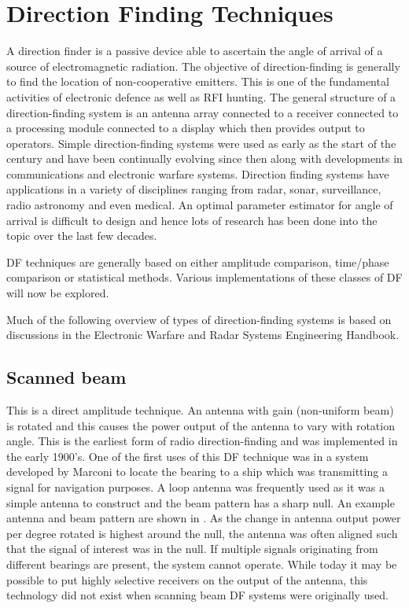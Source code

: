 \section{Direction Finding Techniques}
A direction finder is a passive device able to ascertain the angle of arrival of a source of electromagnetic radiation.
The objective of direction-finding is generally to find the location of non-cooperative emitters\cite{poisel2012electronic}.
This is one of the fundamental activities of electronic defence as well as RFI hunting.
The general structure of a direction-finding system is an antenna array connected to a receiver connected to a processing module connected to a display which then provides output to operators.
Simple direction-finding systems were used as early as the start of the  century and have been continually evolving since then along with developments in communications and electronic warfare systems.
Direction finding systems have applications in a variety of disciplines ranging from radar, sonar, surveillance, radio astronomy and even medical. An optimal parameter estimator for angle of arrival is difficult to design and hence lots of research has been done into the topic over the last few decades\cite{van2004detection}.

DF techniques are generally based on either amplitude comparison, time/phase comparison or statistical methods\cite{tuncer2009classical}. 
Various implementations of these classes of DF will now be explored.

Much of the following overview of types of direction-finding systems is based on discussions in the Electronic Warfare and Radar Systems Engineering Handbook\cite{center2012electronic}.

\subsection{Scanned beam}
This is a direct amplitude technique. An antenna with gain (non-uniform beam) is rotated and this causes the power output of the antenna to vary with rotation angle. This is the earliest form of radio direction-finding and was implemented in the early 1900's. 
One of the first uses of this DF technique was in a system developed by Marconi to locate the bearing to a ship which was transmitting a signal for navigation purposes\cite{jenkins1991smallaperture}. A loop antenna was frequently used as it was a simple antenna to construct and the beam pattern has a sharp null. 
An example antenna and beam pattern are shown in . As the change in antenna output power per degree rotated is highest around the null, the antenna was often aligned such that the signal of interest was in the null. 
If multiple signals originating from different bearings are present, the system cannot operate. 
While today it may be possible to put highly selective receivers on the output of the antenna, this technology did not exist when scanning beam DF systems were originally used.

